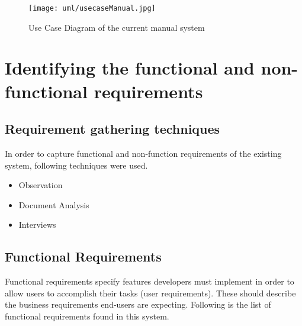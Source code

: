 \documentclass[12pt]{report}
\begin{document}
\begin{figure}[H]
	\centering
	\texttt{[image: uml/usecaseManual.jpg]}
	\caption{Use Case Diagram of the current manual system}
\end{figure}

\section{Identifying the functional and non-functional requirements}

\subsection{Requirement gathering techniques}
In order to capture functional and non-function requirements of the existing system, following techniques were used.

\begin{itemize}
	\item Observation
	\item Document Analysis
	\item Interviews
\end{itemize}

\subsection{Functional Requirements}
Functional requirements specify features developers must implement in order to allow users to accomplish their tasks (user requirements).  These should describe the business requirements end-users are expecting. Following is the list of functional requirements found in this system.
\end{document}
